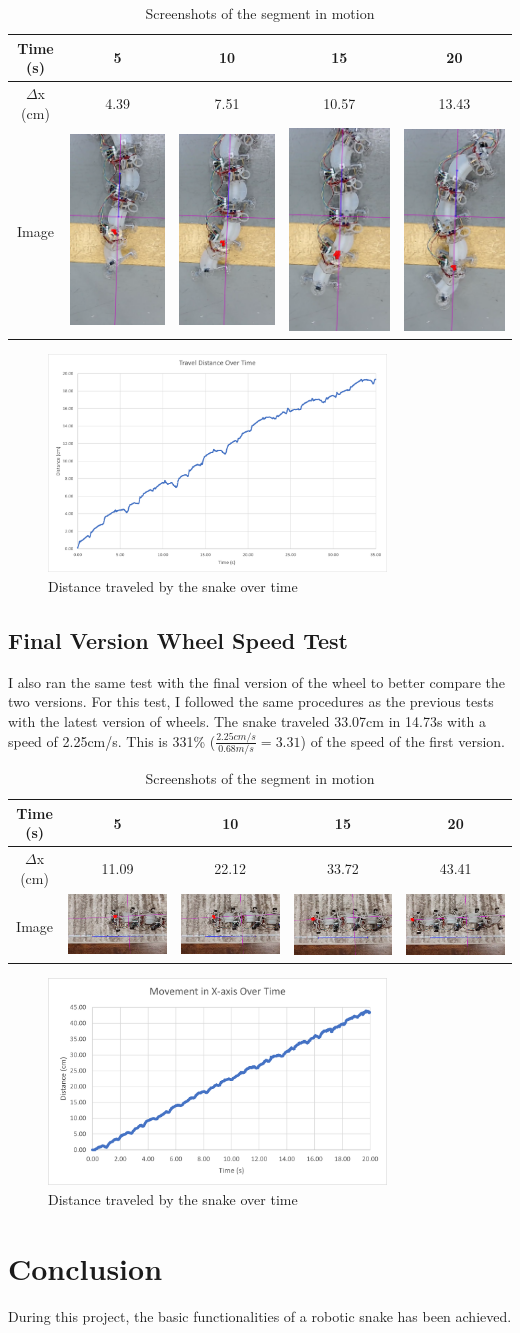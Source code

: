 \documentclass[twoside, 11pt]{article}
\begin{document}
\begin{table} [H]
	\centering
	\begin{tabular}{|c|c|c|c|c|}
	\hline
	Time (s) & 5 & 10 & 15 & 20\\
	\hline
	$\Delta$x (cm) & 4.39 & 7.51 & 10.57 & 13.43\\
	\hline
	Image & \includegraphics[align=c, scale=0.2]{5} & \includegraphics[align=c, scale=0.2]{10} & \includegraphics[align=c, scale=0.2]{15} & \includegraphics[align=c, scale=0.2]{20}\\
	\hline
	\end{tabular}
	\caption{Screenshots of the segment in motion}
\end{table}

\begin{figure} [H]
\centering
\includegraphics[width=0.8\textwidth]{4 seg snake}
\caption{Distance traveled by the snake over time}
\end{figure}
\subsection{Final Version Wheel Speed Test}

I also ran the same test with the final version of the wheel to better compare the two versions. For this test, I followed the same procedures as the previous tests with the latest version of wheels. The snake traveled 33.07cm in 14.73s with a speed of 2.25cm/s. This is 331\% ($\frac{2.25cm/s}{0.68m/s}=3.31$) of the speed of the first version.

\begin{table} [H]
	\centering
	\begin{tabular}{|c|c|c|c|c|}
	\hline
	Time (s) & 5 & 10 & 15 & 20\\
	\hline
	$\Delta$x (cm) & 11.09 & 22.12 & 33.72 & 43.41\\
	\hline
	Image & \includegraphics[align=c, scale=0.2, angle=90]{5_2} & \includegraphics[align=c, scale=0.2, angle=90]{10_2} & \includegraphics[align=c, scale=0.2, angle=90]{15_2} & \includegraphics[align=c, scale=0.2, angle=90]{20_2}\\
	\hline
	\end{tabular}
	\caption{Screenshots of the segment in motion}
\end{table}

\begin{figure} [H]
\centering
\includegraphics[width=0.8\textwidth]{full_snake_improve}
\caption{Distance traveled by the snake over time}
\end{figure}

\section{Conclusion}

During this project, the basic functionalities of a robotic snake has been achieved.
\end{document}
